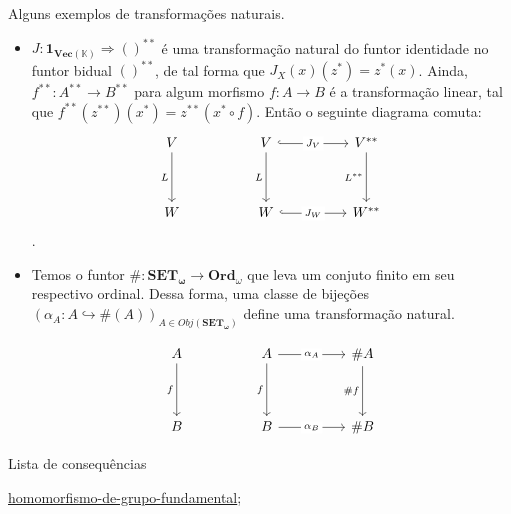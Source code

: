 \begin{ex}
	Alguns exemplos de transformações naturais.
 
    \begin{itemize}
        \item $J:\mathbf{1_{\mathbf{Vec(\mathbb{K})}}} \Longrightarrow ()^{**} $ é uma transformação natural do funtor identidade no funtor bidual $()^{**}$, de tal forma que $J_X(x)(z^*) = z^*(x)$. Ainda, $f^{**}: A^{**} \longrightarrow B^{**}$ para algum morfismo $f: A \longrightarrow B$ é a transformação linear, tal que $f^{**}(z^{**})(x^*) = z^{**}(x^{*} \circ f)$. Então o seguinte diagrama comuta:
\[\begin{tikzcd}
	V && V && {V^{**}} \\
	\\
	W && W && {W^{**}}
	\arrow["L"', from=1-1, to=3-1]
	\arrow["{J_V}"{description}, hook, from=1-3, to=1-5]
	\arrow["L"', from=1-3, to=3-3]
	\arrow["{L^{**}}"', from=1-5, to=3-5]
	\arrow["{J_W}"{description}, hook, from=3-3, to=3-5]
\end{tikzcd}\].

\item Temos o funtor $\#: \mathbf{SET_\omega} \longrightarrow \mathbf{Ord}_\omega$ que leva um conjuto finito em seu respectivo ordinal. Dessa forma, uma classe de bijeções $(\alpha_A: A \hookrightarrow \#(A))_{A \in Obj(\mathbf{SET_\omega})}$ define uma transformação natural.

\[\begin{tikzcd}
	A && A && {\#A} \\
	\\
	B && B && {\#B}
	\arrow["f"', from=1-1, to=3-1]
	\arrow["{\alpha_A}"{description}, from=1-3, to=1-5]
	\arrow["f"', from=1-3, to=3-3]
	\arrow["{\#f}"', from=1-5, to=3-5]
	\arrow["{\alpha_B}"{description}, from=3-3, to=3-5]
\end{tikzcd}\]


        
    \end{itemize}
\end{ex}


\begin{titlemize}{Lista de consequências}
	\item \hyperref[hom-grupo-fundamental]{homomorfismo-de-grupo-fundamental};\\ %
\end{titlemize}
